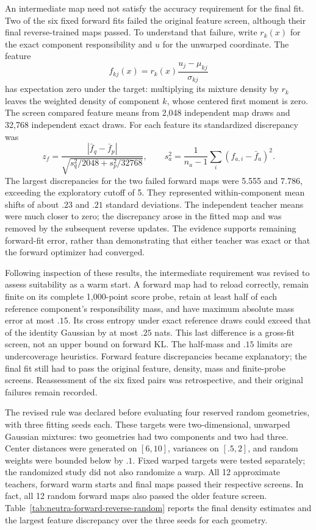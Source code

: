An intermediate map need not satisfy the accuracy requirement for the final
fit. Two of the six fixed forward fits failed the original feature screen,
although their final reverse-trained maps passed. To understand that failure,
write $r_k(x)$ for the exact component responsibility and $u$ for the unwarped
coordinate. The feature
\begin{equation}
 f_{kj}(x)=r_k(x)\frac{u_j-\mu_{kj}}{\sigma_{kj}}
\end{equation}
has expectation zero under the target: multiplying its mixture density by
$r_k$ leaves the weighted density of component $k$, whose centered first
moment is zero. The screen compared feature means from 2,048 independent map
draws and 32,768 independent exact draws. For each feature its standardized
discrepancy was
\begin{equation}
 z_f=\frac{|\bar f_q-\bar f_p|}
 {\sqrt{s_q^2/2048+s_p^2/32768}},
 \qquad s_a^2=\frac{1}{n_a-1}\sum_i(f_{a,i}-\bar f_a)^2.
\end{equation}
The largest discrepancies for the two failed forward maps were 5.555 and
7.786, exceeding the exploratory cutoff of 5. They represented within-component
mean shifts of about $.23$ and $.21$ standard deviations. The independent
teacher means were much closer to zero; the discrepancy arose in the fitted
map and was removed by the subsequent reverse updates. The evidence supports
remaining forward-fit error, rather than demonstrating that either teacher
was exact or that the forward optimizer had converged.

Following inspection of these results, the intermediate requirement was
revised to assess suitability as a warm start. A forward map had to reload
correctly, remain finite on its complete 1,000-point score probe, retain at
least half of each reference component's responsibility mass, and have maximum
absolute mass error at most $.15$. Its cross entropy under exact reference
draws could exceed that of the identity Gaussian by at most $.25$ nats. This
last difference is a gross-fit screen, not an upper bound on forward KL.
The half-mass and $.15$ limits are undercoverage heuristics. Forward feature
discrepancies became explanatory; the final fit still had to pass the original
feature, density, mass and finite-probe screens. Reassessment of the six fixed
pairs was retrospective, and their original failures remain recorded.

The revised rule was declared before evaluating four reserved random
geometries, with three fitting seeds each. These targets were two-dimensional,
unwarped Gaussian mixtures: two geometries had two components and two had
three. Center distances were generated on $[6,10]$, variances on $[.5,2]$,
and random weights were bounded below by $.1$. Fixed warped targets were
tested separately; the randomized study did not also randomize a warp. All
12 approximate teachers, forward warm starts and final maps passed their
respective screens. In fact, all 12 random forward maps also passed the older
feature screen. Table~\ref{tab:neutra-forward-reverse-random} reports the
final density estimates and the largest feature discrepancy over the three
seeds for each geometry.

